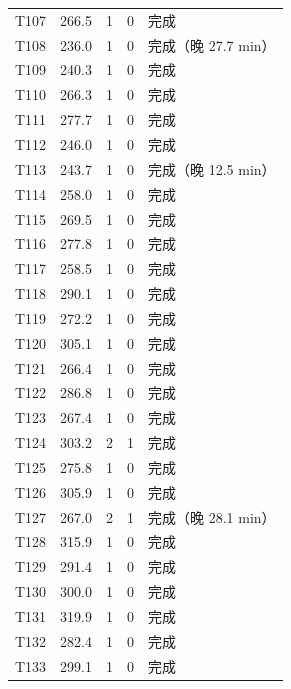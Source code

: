 \documentclass[a4paper,11pt]{article}
\begin{document}
\begin{table}[htbp]
\begin{tabular}{rcccl}
T107 & 266.5 & 1 & 0 & 完成 \\
T108 & 236.0 & 1 & 0 & 完成（晚 27.7 min） \\
T109 & 240.3 & 1 & 0 & 完成 \\
T110 & 266.3 & 1 & 0 & 完成 \\
T111 & 277.7 & 1 & 0 & 完成 \\
T112 & 246.0 & 1 & 0 & 完成 \\
T113 & 243.7 & 1 & 0 & 完成（晚 12.5 min） \\
T114 & 258.0 & 1 & 0 & 完成 \\
T115 & 269.5 & 1 & 0 & 完成 \\
T116 & 277.8 & 1 & 0 & 完成 \\
T117 & 258.5 & 1 & 0 & 完成 \\
T118 & 290.1 & 1 & 0 & 完成 \\
T119 & 272.2 & 1 & 0 & 完成 \\
T120 & 305.1 & 1 & 0 & 完成 \\
T121 & 266.4 & 1 & 0 & 完成 \\
T122 & 286.8 & 1 & 0 & 完成 \\
T123 & 267.4 & 1 & 0 & 完成 \\
T124 & 303.2 & 2 & 1 & 完成 \\
T125 & 275.8 & 1 & 0 & 完成 \\
T126 & 305.9 & 1 & 0 & 完成 \\
T127 & 267.0 & 2 & 1 & 完成（晚 28.1 min） \\
T128 & 315.9 & 1 & 0 & 完成 \\
T129 & 291.4 & 1 & 0 & 完成 \\
T130 & 300.0 & 1 & 0 & 完成 \\
T131 & 319.9 & 1 & 0 & 完成 \\
T132 & 282.4 & 1 & 0 & 完成 \\
T133 & 299.1 & 1 & 0 & 完成 \\
\bottomrule
\end{tabular}
\end{table}
\end{document}
